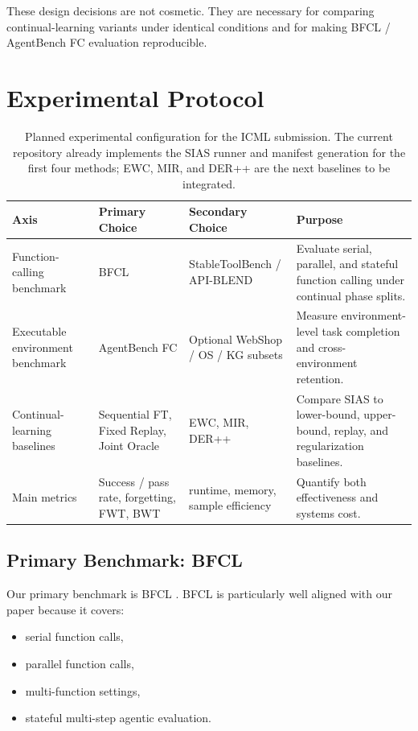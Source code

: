 \documentclass{article}
\begin{document}
These design decisions are not cosmetic. They are necessary for comparing continual-learning variants under identical conditions and for making BFCL / AgentBench FC evaluation reproducible.

\section{Experimental Protocol}

\begin{table}[t]
\centering
\caption{Planned experimental configuration for the ICML submission. The current repository already implements the SIAS runner and manifest generation for the first four methods; EWC, MIR, and DER++ are the next baselines to be integrated.}
\label{tab:protocol}
\begin{tabular}{p{2.1cm}p{3.2cm}p{3.1cm}p{4.3cm}}
\toprule
\textbf{Axis} & \textbf{Primary Choice} & \textbf{Secondary Choice} & \textbf{Purpose} \\
\midrule
Function-calling benchmark & BFCL & StableToolBench / API-BLEND & Evaluate serial, parallel, and stateful function calling under continual phase splits. \\
Executable environment benchmark & AgentBench FC & Optional WebShop / OS / KG subsets & Measure environment-level task completion and cross-environment retention. \\
Continual-learning baselines & Sequential FT, Fixed Replay, Joint Oracle & EWC, MIR, DER++ & Compare SIAS to lower-bound, upper-bound, replay, and regularization baselines. \\
Main metrics & Success / pass rate, forgetting, FWT, BWT & runtime, memory, sample efficiency & Quantify both effectiveness and systems cost. \\
\bottomrule
\end{tabular}
\end{table}

\subsection{Primary Benchmark: BFCL}

Our primary benchmark is BFCL \citep{patil2025bfcl}. BFCL is particularly well aligned with our paper because it covers:
\begin{itemize}[leftmargin=12pt]
    \item serial function calls,
    \item parallel function calls,
    \item multi-function settings,
    \item stateful multi-step agentic evaluation.
\end{itemize}
\end{document}
